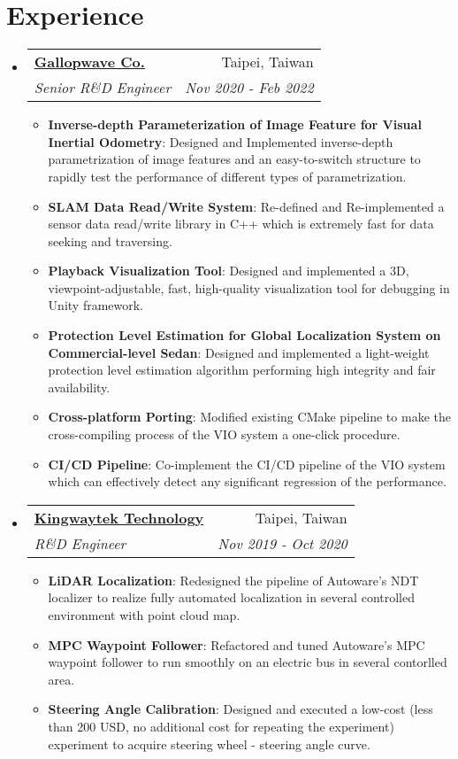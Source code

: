 \documentclass[a4paper,20pt]{article}
\makeatletter
\newcommand{\resumeItem}[2]{
  \item\small{
    \textbf{#1}{: #2 \vspace{-2pt}}
  }
}
\newcommand{\resumeSubheading}[4]{
  \vspace{-1pt}\item
    \begin{tabular*}{0.97\textwidth}{l@{\extracolsep{\fill}}r}
      \textbf{#1} & #2 \\
      \textit{#3} & \textit{#4} \\
    \end{tabular*}\vspace{-5pt}
}
\newcommand{\resumeSubHeadingListStart}{\begin{itemize}[leftmargin=*]}
\newcommand{\resumeSubHeadingListEnd}{\end{itemize}}
\newcommand{\resumeItemListStart}{\begin{itemize}}
\newcommand{\resumeItemListEnd}{\end{itemize}\vspace{-5pt}}
\makeatother
\begin{document}
\section{Experience}
  \resumeSubHeadingListStart
    \resumeSubheading{\href{https://www.gallopwave.com/}{Gallopwave Co.}}{Taipei, Taiwan}
      {Senior R\&D Engineer}{Nov 2020 - Feb 2022}
    \resumeItemListStart
        \resumeItem{Inverse-depth Parameterization of Image Feature for Visual Inertial Odometry}
          {Designed and Implemented inverse-depth parametrization of image features and an easy-to-switch structure to rapidly test the performance of different types of parametrization. }
        \resumeItem{SLAM Data Read/Write System}
          {Re-defined and Re-implemented a sensor data read/write library in C++ which is extremely fast for data seeking and traversing.}
        \resumeItem{Playback Visualization Tool}
          {Designed and implemented a 3D, viewpoint-adjustable, fast, high-quality visualization tool for debugging in Unity framework.}
        \resumeItem{Protection Level Estimation for Global Localization System on Commercial-level Sedan}
          {Designed and implemented a light-weight protection level estimation algorithm performing high integrity and fair availability.}
        \resumeItem{Cross-platform Porting}
          {Modified existing CMake pipeline to make the cross-compiling process of the VIO system a one-click procedure.}
        \resumeItem{CI/CD Pipeline}
          {Co-implement the CI/CD pipeline of the VIO system which can effectively detect any significant regression of the performance.}
      \resumeItemListEnd
    \resumeSubheading{\href{http://www.kingwaytek.com/}{Kingwaytek Technology}}{Taipei, Taiwan}
      {R\&D Engineer}{Nov 2019 - Oct 2020}
		\resumeItemListStart
        \resumeItem{LiDAR Localization}
          {Redesigned the pipeline of Autoware's NDT localizer to realize fully automated localization in several controlled environment with point cloud map.}
        \resumeItem{MPC Waypoint Follower}
          {Refactored and tuned Autoware's MPC waypoint follower to run smoothly on an electric bus in several contorlled area.}
        \resumeItem{Steering Angle Calibration}
          {Designed and executed a low-cost (less than 200 USD, no additional cost for repeating the experiment) experiment to acquire steering wheel - steering angle curve.}
		\resumeItemListEnd
\resumeSubHeadingListEnd

\vspace{-5pt}
\end{document}

